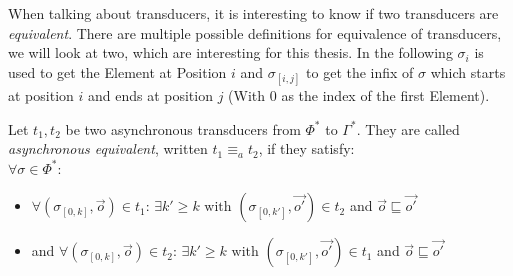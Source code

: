 When talking about transducers, it is interesting to know if two transducers are \emph{equivalent}.
There are multiple possible definitions for equivalence of transducers, we will look at two, which are interesting for this thesis.
In the following \(\sigma_i\) is used to get the Element at Position \(i\) and \(\sigma_{[i,j]}\) to get the infix of \(\sigma\) which starts at position \(i\) and ends at position \(j\) (With \(0\) as the index of the first Element).

\begin{definition}[name = Asynchronous equivalence of Transducers]\label{def:async_equivalence_transducer}
  Let \(t_1, t_2\) be two asynchronous transducers from \(\Phi^*\) to \(\Gamma^*\).
  They are called \emph{asynchronous equivalent}, written \(t_1 \equiv_a t_2\), if they satisfy: \\
  \(\forall \sigma \in \Phi^*\):
  \begin{itemize}
    \item \(\forall (\sigma_{[0,k]}, \vec{o}) \in t_1\): \(\exists k' \geq k \text{ with } (\sigma_{[0,k']}, \vec{o'}) \in t_2\) and \(\vec{o} \sqsubseteq \vec{o'}\)
    \item and \(\forall (\sigma_{[0,k]}, \vec{o}) \in t_2\): \(\exists k' \geq k \text{ with } (\sigma_{[0,k']}, \vec{o'}) \in t_1\) and \(\vec{o} \sqsubseteq \vec{o'}\)
  \end{itemize}
\end{definition}

